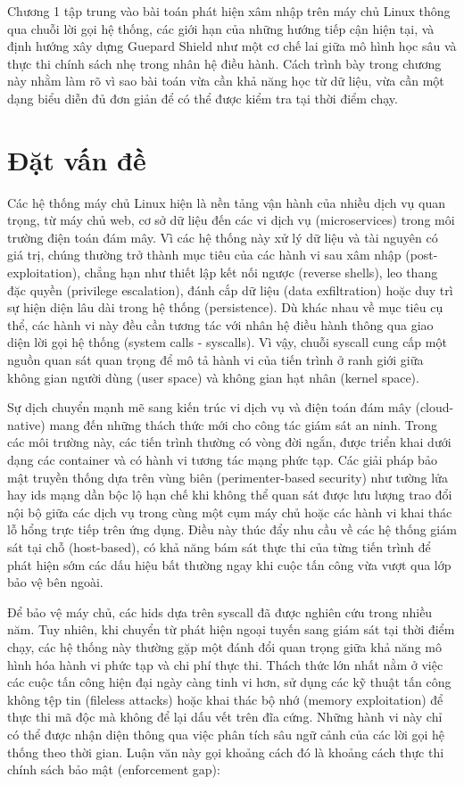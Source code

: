 \documentclass[../main.tex]{subfiles}
\begin{document}
Chương 1 tập trung vào bài toán phát hiện xâm nhập trên máy chủ
Linux thông qua chuỗi lời gọi hệ thống, các giới hạn của những hướng
tiếp cận hiện tại, và định hướng xây dựng Guepard Shield như một cơ
chế lai giữa mô hình học sâu và thực thi chính sách nhẹ trong nhân hệ
điều hành. Cách trình bày trong chương này nhằm làm rõ vì sao bài
toán vừa cần khả năng học từ dữ liệu, vừa cần một dạng biểu diễn đủ
đơn giản để có thể được kiểm tra tại thời điểm chạy.

\section{Đặt vấn đề}
\label{sec:dvd}

Các hệ thống máy chủ Linux hiện là nền tảng vận hành của nhiều dịch
vụ quan trọng, từ máy chủ web, cơ sở dữ liệu đến các vi dịch vụ
(microservices) trong môi trường điện toán đám mây. Vì các hệ thống
này xử lý dữ liệu và tài nguyên có giá trị, chúng thường trở thành
mục tiêu của các hành vi sau xâm nhập (post-exploitation), chẳng hạn
như thiết lập kết nối ngược (reverse shells), leo thang đặc quyền
(privilege escalation), đánh cắp dữ liệu (data exfiltration) hoặc duy
trì sự hiện diện lâu dài trong hệ thống (persistence). Dù khác nhau
về mục tiêu cụ thể, các hành vi này đều cần tương tác với nhân hệ
điều hành thông qua giao diện lời gọi hệ thống (system calls -
syscalls). Vì vậy, chuỗi \gls{syscall} cung cấp một nguồn quan sát quan
trọng để mô tả hành vi của tiến trình ở ranh giới giữa không gian
người dùng (user space) và không gian hạt nhân (kernel space).

Sự dịch chuyển mạnh mẽ sang kiến trúc vi dịch vụ và điện toán đám mây
(cloud-native) mang đến những thách thức mới cho công tác giám sát an
ninh. Trong các môi trường này, các tiến trình thường có vòng đời
ngắn, được triển khai dưới dạng các container và có hành vi tương tác
mạng phức tạp. Các giải pháp bảo mật truyền thống dựa trên vùng biên
(perimenter-based security) như tường lửa hay \gls{ids} mạng dần bộc lộ
hạn chế khi không thể quan sát được lưu lượng trao đổi nội bộ giữa
các dịch vụ trong cùng một cụm máy chủ hoặc các hành vi khai thác lỗ
hổng trực tiếp trên ứng dụng. Điều này thúc đẩy nhu cầu về các hệ thống giám
sát tại chỗ (host-based), có khả năng bám sát thực thi của từng tiến
trình để phát hiện sớm các dấu hiệu bất thường ngay khi cuộc tấn công
vừa vượt qua lớp bảo vệ bên ngoài.

Để bảo vệ máy chủ, các \gls{hids} dựa trên \gls{syscall} đã
được nghiên cứu trong nhiều năm. Tuy nhiên, khi chuyển từ phát hiện
ngoại tuyến sang giám sát tại thời điểm chạy, các hệ thống này thường
gặp một đánh đổi quan trọng giữa khả năng mô hình hóa hành vi phức
tạp và chi phí thực thi. Thách thức lớn nhất nằm ở việc các cuộc tấn
công hiện đại ngày càng tinh vi hơn, sử dụng các kỹ thuật tấn công
không tệp tin (fileless attacks) hoặc khai thác bộ nhớ (memory
exploitation) để thực thi mã độc mà không để lại dấu vết trên đĩa
cứng. Những hành vi này chỉ có thể được nhận diện thông qua việc
phân tích sâu ngữ cảnh của các lời gọi hệ thống theo thời gian.
Luận văn này gọi khoảng cách đó là khoảng cách thực thi chính sách
bảo mật (enforcement gap):
\end{document}
